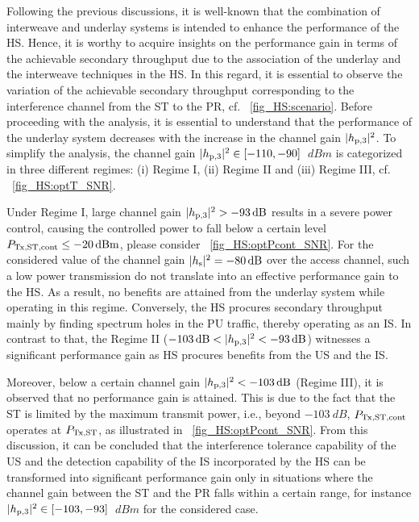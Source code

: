 Following the previous discussions, it is well-known that the combination of interweave and underlay systems is intended to enhance the performance of the HS. Hence, it is worthy to acquire insights on the performance gain in terms of the achievable secondary throughput due to the association of the underlay and the interweave techniques in the HS. In this regard, it is essential to observe the variation of the achievable secondary throughput corresponding to the interference channel from the ST to the PR, cf. \figurename~\ref{fig_HS:scenario}. Before proceeding with the analysis, it is essential to understand that the performance of the underlay system decreases with the increase in the channel gain $|h_{\text{p,3}}|^2$. To simplify the analysis, the channel gain $|h_{\text{p,3}}|^2 \in [-110, -90]$ $\SI{}{dBm}$ is categorized in three different regimes: (i) Regime I, (ii) Regime II and (iii) Regime III, cf. \figurename~\ref{fig_HS:optT_SNR}. 

Under Regime I, large channel gain $|h_{\text{p,3}}|^2 > -\SI{93}{dB}$ results in a severe power control, causing the controlled power to fall below a certain level $P_{\text{Tx,ST,cont}} \le \SI{-20}{dBm}$, please consider \figurename~\ref{fig_HS:optPcont_SNR}. For the considered value of the channel gain $|h_{\text{s}}|^2 = \SI{-80}{dB}$ over the access channel, such a low power transmission do not translate into an effective performance gain to the HS. As a result, no benefits are attained from the underlay system while operating in this regime. Conversely, the HS procures secondary throughput mainly by finding spectrum holes in the PU traffic, thereby operating as an IS. In contrast to that, the Regime II ($-\SI{103}{dB} < |h_{\text{p,3}}|^2 < -\SI{93}{dB}$) witnesses a significant performance gain as HS procures benefits from the US and the IS. 

Moreover, below a certain channel gain $|h_{\text{p,3}}|^2 < \SI{-103}{dB}$ (Regime III), it is observed that no performance gain is attained. This is due to the fact that the ST is limited by the maximum transmit power, i.e., beyond $\SI{-103}{dB}$, $P_{\text{Tx,ST,cont}}$ operates at $P_{\text{Tx,ST}}$, as illustrated in \figurename~\ref{fig_HS:optPcont_SNR}. From this discussion, it can be concluded that the interference tolerance capability of the US and the detection capability of the IS incorporated by the HS can be transformed into significant performance gain only in situations where the channel gain between the ST and the PR falls within a certain range, for instance $|h_{\text{p,3}}|^2 \in [-103,-93]$ $\SI{}{dBm}$ for the considered case.



